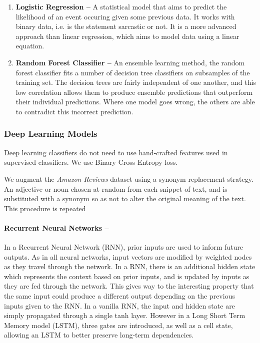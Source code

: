 \documentclass[12pt,a4paper]{article}
\begin{document}
\begin{enumerate}[leftmargin=0cm]
	\item \textbf{Logistic Regression --} A statistical model that aims to predict the likelihood of an event occuring given some previous data. It works with binary data, i.e. is the statement sarcastic or not. It is a more advanced approach than linear regression, which aims to model data using a linear equation.

	\item \textbf{Random Forest Classifier --}
	An ensemble learning method, the random forest classifier fits a number of decision tree classifiers on subsamples of the training set. The decision trees are fairly independent of one another, and this low correlation allows them to produce ensemble predictions that outperform their individual predictions. Where one model goes wrong, the others are able to contradict this incorrect prediction.
\end{enumerate}


\subsubsection{Deep Learning Models}
Deep learning classifiers do not need to use hand-crafted features used in supervised classifiers. We use Binary Cross-Entropy loss.

We augment the \textit{Amazon Reviews} dataset using a synonym replacement strategy.  An adjective or noun chosen at random from each snippet of text, and is substituted with a synonym so as not to alter the original meaning of the text. This procedure is repeated 


\paragraph{Recurrent Neural Networks --}
In a Recurrent Neural Network (RNN), prior inputs are used to inform future outputs. As in all neural networks, input vectors are modified by weighted nodes as they travel through the network. In a RNN, there is an additional hidden state which represents the context based on prior inputs, and is updated by inputs as they are fed through the network. This gives way to the interesting property that the same input could produce a different output depending on the previous inputs given to the RNN. In a vanilla RNN, the input and hidden state are simply propagated through a single tanh layer. However in a Long Short Term Memory model (LSTM), three gates are introduced, as well as a cell state, allowing an LSTM to better preserve long-term dependencies.\\
\end{document}
